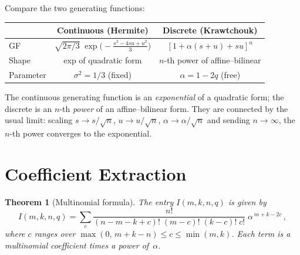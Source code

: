\documentclass[11pt,a4paper]{article}
\theoremstyle{plain}
\newtheorem{theorem}{Theorem}[section]
\theoremstyle{definition}
\begin{document}
\begin{tcolorbox}[colback=yellow!10, colframe=yellow!10, boxrule=0pt,
  sharp corners]
Compare the two generating functions:

\medskip
\begin{center}
\renewcommand{\arraystretch}{1.4}
\begin{tabular}{lcc}
  \toprule
  & Continuous (Hermite) & Discrete (Krawtchouk) \\
  \midrule
  GF & $\sqrt{2\pi/3}\;\exp\!\bigl(-\frac{s^2 - 4su + u^2}{3}\bigr)$
     & $[1 + \alpha(s+u) + su]^n$ \\[4pt]
  Shape & exp of quadratic form & $n$-th power of affine--bilinear \\
  Parameter & $\sigma^2 = 1/3$ (fixed) & $\alpha = 1-2q$ (free) \\
  \bottomrule
\end{tabular}
\end{center}

\medskip
The continuous generating function is an \emph{exponential} of a
quadratic form; the discrete is an $n$-th \emph{power} of an
affine--bilinear form. They are connected by the usual limit: scaling
$s \to s/\sqrt{n}$, $u \to u/\sqrt{n}$, $\alpha \to \alpha/\sqrt{n}$
and sending $n \to \infty$, the $n$-th power converges to the
exponential.
\end{tcolorbox}

\section{Coefficient Extraction}

\begin{tcolorbox}[colback=black!5, colframe=black!5, boxrule=0pt,
  sharp corners]
\begin{theorem}[Multinomial formula]\label{thm:coeff}
The entry $I(m, k, n, q)$ is given by
\begin{equation}\label{eq:coeff}
  I(m, k, n, q)
  = \sum_{c} \frac{n!}{(n{-}m{-}k{+}c)!\;(m{-}c)!\;(k{-}c)!\;c!}
    \;\alpha^{\,m+k-2c}\,,
\end{equation}
where $c$ ranges over
$\max(0,\, m{+}k{-}n) \le c \le \min(m, k)$.
Each term is a multinomial coefficient times a power of~$\alpha$.
\end{theorem}
\end{tcolorbox}
\end{document}
